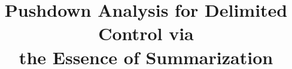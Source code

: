 \documentclass[10pt]{sigplanconf}
\title{Pushdown Analysis for Delimited Control via\\the Essence of Summarization}
\begin{document}
\maketitle


\begin{abstract}

\end{abstract}



\balance


\end{document}
